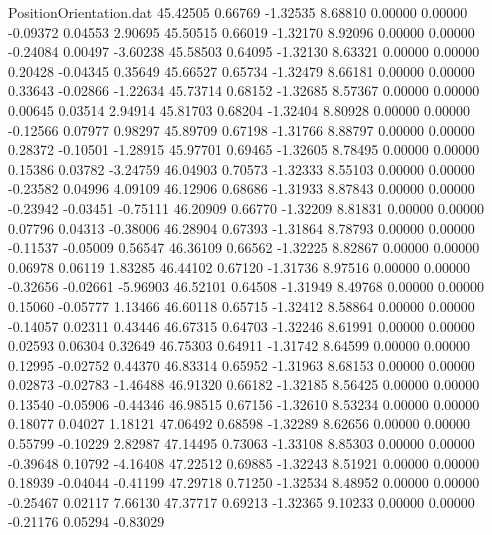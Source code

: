 \begin{filecontents}{PositionOrientation.dat}
  45.42505    0.66769   -1.32535     8.68810    0.00000    0.00000   -0.09372    0.04553    2.90695
  45.50515    0.66019   -1.32170     8.92096    0.00000    0.00000   -0.24084    0.00497   -3.60238
  45.58503    0.64095   -1.32130     8.63321    0.00000    0.00000    0.20428   -0.04345    0.35649
  45.66527    0.65734   -1.32479     8.66181    0.00000    0.00000    0.33643   -0.02866   -1.22634
  45.73714    0.68152   -1.32685     8.57367    0.00000    0.00000    0.00645    0.03514    2.94914
  45.81703    0.68204   -1.32404     8.80928    0.00000    0.00000   -0.12566    0.07977    0.98297
  45.89709    0.67198   -1.31766     8.88797    0.00000    0.00000    0.28372   -0.10501   -1.28915
  45.97701    0.69465   -1.32605     8.78495    0.00000    0.00000    0.15386    0.03782   -3.24759
  46.04903    0.70573   -1.32333     8.55103    0.00000    0.00000   -0.23582    0.04996    4.09109
  46.12906    0.68686   -1.31933     8.87843    0.00000    0.00000   -0.23942   -0.03451   -0.75111
  46.20909    0.66770   -1.32209     8.81831    0.00000    0.00000    0.07796    0.04313   -0.38006
  46.28904    0.67393   -1.31864     8.78793    0.00000    0.00000   -0.11537   -0.05009    0.56547
  46.36109    0.66562   -1.32225     8.82867    0.00000    0.00000    0.06978    0.06119    1.83285
  46.44102    0.67120   -1.31736     8.97516    0.00000    0.00000   -0.32656   -0.02661   -5.96903
  46.52101    0.64508   -1.31949     8.49768    0.00000    0.00000    0.15060   -0.05777    1.13466
  46.60118    0.65715   -1.32412     8.58864    0.00000    0.00000   -0.14057    0.02311    0.43446
  46.67315    0.64703   -1.32246     8.61991    0.00000    0.00000    0.02593    0.06304    0.32649
  46.75303    0.64911   -1.31742     8.64599    0.00000    0.00000    0.12995   -0.02752    0.44370
  46.83314    0.65952   -1.31963     8.68153    0.00000    0.00000    0.02873   -0.02783   -1.46488
  46.91320    0.66182   -1.32185     8.56425    0.00000    0.00000    0.13540   -0.05906   -0.44346
  46.98515    0.67156   -1.32610     8.53234    0.00000    0.00000    0.18077    0.04027    1.18121
  47.06492    0.68598   -1.32289     8.62656    0.00000    0.00000    0.55799   -0.10229    2.82987
  47.14495    0.73063   -1.33108     8.85303    0.00000    0.00000   -0.39648    0.10792   -4.16408
  47.22512    0.69885   -1.32243     8.51921    0.00000    0.00000    0.18939   -0.04044   -0.41199
  47.29718    0.71250   -1.32534     8.48952    0.00000    0.00000   -0.25467    0.02117    7.66130
  47.37717    0.69213   -1.32365     9.10233    0.00000    0.00000   -0.21176    0.05294   -0.83029

\end{filecontents}

